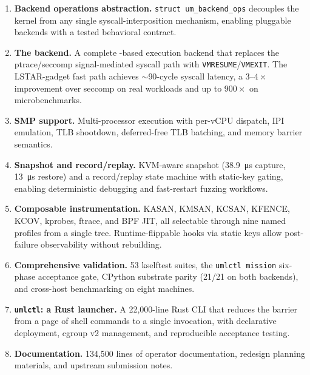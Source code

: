 \begin{enumerate}[leftmargin=2em]
  \item \textbf{Backend operations abstraction.}
    \texttt{struct um\_backend\_ops} decouples the \UML{} kernel from
    any single syscall-interposition mechanism, enabling pluggable
    backends with a tested behavioral contract.

  \item \textbf{The \KVMvTwo{} backend.}
    A complete \KVM{}-based execution backend that replaces the
    ptrace/seccomp signal-mediated syscall path with
    \texttt{VMRESUME}/\texttt{VMEXIT}.  The LSTAR-gadget fast path
    achieves $\sim$90-cycle syscall latency, a $3$--$4\times$ improvement
    over seccomp on real workloads and up to $900\times$ on
    microbenchmarks.

  \item \textbf{SMP support.}
    Multi-processor execution with per-vCPU dispatch, IPI emulation,
    TLB shootdown, deferred-free TLB batching, and memory barrier
    semantics.

  \item \textbf{Snapshot and record/replay.}
    KVM-aware snapshot (\SI{38.9}{\micro\second} capture,
    \SI{13}{\micro\second} restore) and a record/replay state machine
    with static-key gating, enabling deterministic debugging and
    fast-restart fuzzing workflows.

  \item \textbf{Composable instrumentation.}
    KASAN, KMSAN, KCSAN, KFENCE, KCOV, kprobes, ftrace, and BPF JIT,
    all selectable through nine named profiles from a single tree.
    Runtime-flippable hooks via static keys allow post-failure
    observability without rebuilding.

  \item \textbf{Comprehensive validation.}
    53 kselftest suites, the \texttt{umlctl mission} six-phase
    acceptance gate, CPython substrate parity (21/21 on both backends),
    and cross-host benchmarking on eight machines.

  \item \textbf{\texttt{umlctl}: a Rust launcher.}
    A 22,000-line Rust CLI that reduces the barrier from a page of
    shell commands to a single invocation, with declarative deployment,
    cgroup v2 management, and reproducible acceptance testing.

  \item \textbf{Documentation.}
    134,500 lines of operator documentation, redesign planning
    materials, and upstream submission notes.
\end{enumerate}

